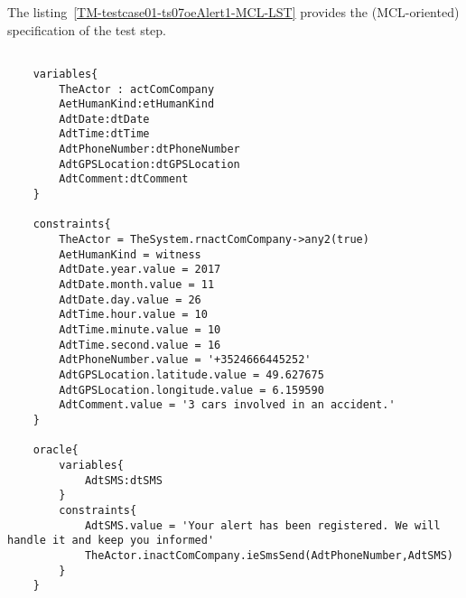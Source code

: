 \begin{teststepmodel}
			{ }

	\end{teststepmodel}
	
	
	
		
	\vspace{1cm}
	The listing~\ref{TM-testcase01-ts07oeAlert1-MCL-LST} provides the \msrmessir (MCL-oriented) specification of the test step.
	
	\scriptsize
	\vspace{0.5cm}
	\begin{lstlisting}[style=MessirStyle,firstnumber=auto,captionpos=b,caption={\msrmessir (MCL-oriented) specification of the test step \emph{testcase01-ts07oeAlert1}.},label=TM-testcase01-ts07oeAlert1-MCL-LST]

	variables{
		TheActor : actComCompany
		AetHumanKind:etHumanKind
		AdtDate:dtDate
		AdtTime:dtTime
		AdtPhoneNumber:dtPhoneNumber
		AdtGPSLocation:dtGPSLocation
		AdtComment:dtComment
	}
	
	constraints{
		TheActor = TheSystem.rnactComCompany->any2(true)
		AetHumanKind = witness
		AdtDate.year.value = 2017
		AdtDate.month.value = 11
		AdtDate.day.value = 26
		AdtTime.hour.value = 10
		AdtTime.minute.value = 10
		AdtTime.second.value = 16
		AdtPhoneNumber.value = '+3524666445252'
		AdtGPSLocation.latitude.value = 49.627675
		AdtGPSLocation.longitude.value = 6.159590
		AdtComment.value = '3 cars involved in an accident.'
	}
	
	oracle{
		variables{
			AdtSMS:dtSMS
		}
		constraints{
			AdtSMS.value = 'Your alert has been registered. We will handle it and keep you informed'
			TheActor.inactComCompany.ieSmsSend(AdtPhoneNumber,AdtSMS)
		}
	}
	
	\end{lstlisting}
	\normalsize 
	
	
